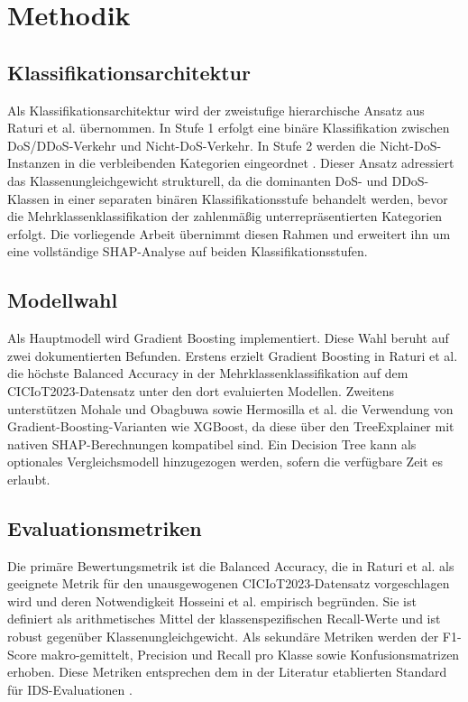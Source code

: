 \section{Methodik}\label{methodik}

\subsection{Klassifikationsarchitektur}

Als Klassifikationsarchitektur wird der zweistufige hierarchische Ansatz aus Raturi et al. \cite{raturi2026exploratory} übernommen. In Stufe 1 erfolgt eine binäre Klassifikation zwischen DoS/DDoS-Verkehr und Nicht-DoS-Verkehr. In Stufe 2 werden die Nicht-DoS-Instanzen in die verbleibenden Kategorien eingeordnet \cite{raturi2026exploratory}. Dieser Ansatz adressiert das Klassenungleichgewicht strukturell, da die dominanten DoS- und DDoS-Klassen in einer separaten binären Klassifikationsstufe behandelt werden, bevor die Mehrklassenklassifikation der zahlenmäßig unterrepräsentierten Kategorien erfolgt. Die vorliegende Arbeit übernimmt diesen Rahmen und erweitert ihn um eine vollständige SHAP-Analyse auf beiden Klassifikationsstufen.

\subsection{Modellwahl}

Als Hauptmodell wird Gradient Boosting implementiert. Diese Wahl beruht auf zwei dokumentierten Befunden. Erstens erzielt Gradient Boosting in Raturi et al. \cite{raturi2026exploratory} die höchste Balanced Accuracy in der Mehrklassenklassifikation auf dem CICIoT2023-Datensatz unter den dort evaluierten Modellen. Zweitens unterstützen Mohale und Obagbuwa \cite{mohale2025xai} sowie Hermosilla et al. \cite{hermosilla2025xai_forensic} die Verwendung von Gradient-Boosting-Varianten wie XGBoost, da diese über den TreeExplainer mit nativen SHAP-Berechnungen kompatibel sind. Ein Decision Tree kann als optionales Vergleichsmodell hinzugezogen werden, sofern die verfügbare Zeit es erlaubt.

\subsection{Evaluationsmetriken}

Die primäre Bewertungsmetrik ist die Balanced Accuracy, die in Raturi et al. \cite{raturi2026exploratory} als geeignete Metrik für den unausgewogenen CICIoT2023-Datensatz vorgeschlagen wird und deren Notwendigkeit Hosseini et al. \cite{hosseini2025imbalance} empirisch begründen. Sie ist definiert als arithmetisches Mittel der klassenspezifischen Recall-Werte und ist robust gegenüber Klassenungleichgewicht. Als sekundäre Metriken werden der F1-Score makro-gemittelt, Precision und Recall pro Klasse sowie Konfusionsmatrizen erhoben. Diese Metriken entsprechen dem in der Literatur etablierten Standard für IDS-Evaluationen \cite{raturi2026exploratory,almahaqeri2026gradient,alharby2025ciciot}.

